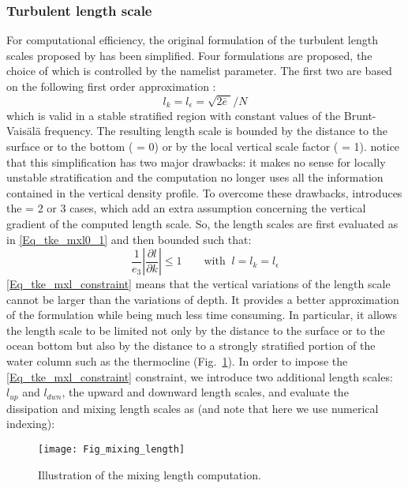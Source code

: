 \documentclass[NEMO_book]{subfiles}
\begin{document}
\subsubsection{Turbulent length scale}
For computational efficiency, the original formulation of the turbulent length 
scales proposed by \citet{Gaspar1990} has been simplified. Four formulations 
are proposed, the choice of which is controlled by the  namelist 
parameter. The first two are based on the following first order approximation 
\citep{Blanke1993}:
\begin{equation} \label{Eq_tke_mxl0_1}
l_k = l_\epsilon = \sqrt {2 \bar{e}\; } / N
\end{equation}
which is valid in a stable stratified region with constant values of the Brunt-
Vais\"{a}l\"{a} frequency. The resulting length scale is bounded by the distance 
to the surface or to the bottom ( = 0) or by the local vertical scale factor 
( = 1). \citet{Blanke1993} notice that this simplification has two major 
drawbacks: it makes no sense for locally unstable stratification and the 
computation no longer uses all the information contained in the vertical density 
profile. To overcome these drawbacks, \citet{Madec1998} introduces the 
 = 2 or 3 cases, which add an extra assumption concerning the vertical 
gradient of the computed length scale. So, the length scales are first evaluated 
as in \eqref{Eq_tke_mxl0_1} and then bounded such that:
\begin{equation} \label{Eq_tke_mxl_constraint}
\frac{1}{e_3 }\left| {\frac{\partial l}{\partial k}} \right| \leq 1
\qquad \text{with }\  l =  l_k = l_\epsilon
\end{equation}
\eqref{Eq_tke_mxl_constraint} means that the vertical variations of the length 
scale cannot be larger than the variations of depth. It provides a better 
approximation of the \citet{Gaspar1990} formulation while being much less 
time consuming. In particular, it allows the length scale to be limited not only 
by the distance to the surface or to the ocean bottom but also by the distance 
to a strongly stratified portion of the water column such as the thermocline 
(Fig.~\ref{Fig_mixing_length}). In order to impose the \eqref{Eq_tke_mxl_constraint} 
constraint, we introduce two additional length scales: $l_{up}$ and $l_{dwn}$, 
the upward and downward length scales, and evaluate the dissipation and 
mixing length scales as (and note that here we use numerical indexing):
\begin{figure}[!t] \begin{center}
\texttt{[image: Fig\_mixing\_length]}
\caption{ \label{Fig_mixing_length} 
Illustration of the mixing length computation. }
\end{center}  
\end{figure}
\end{document}
